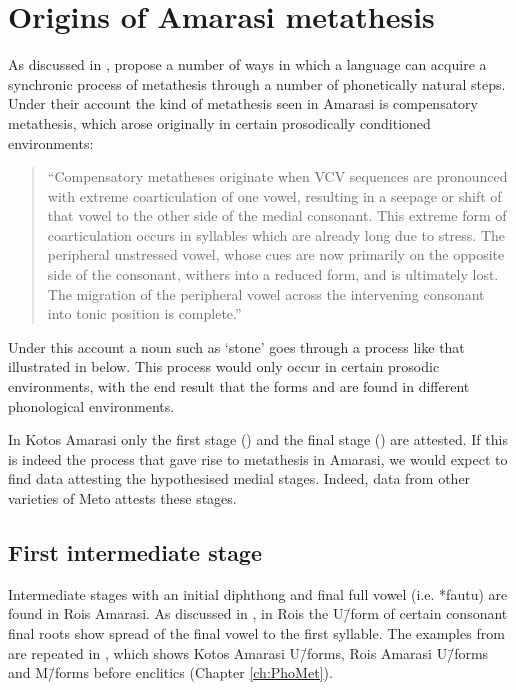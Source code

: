 \section{Origins of Amarasi metathesis}\label{sec:OriMetAma}
As discussed in , \cite{blga98,blga04} propose
a number of ways in which a language can acquire a synchronic process
of metathesis through a number of phonetically natural steps.
Under their account the kind of metathesis seen
in Amarasi is compensatory metathesis,
which arose originally in certain prosodically conditioned environments:

\begin{quote}
``Compensatory metatheses originate when VCV sequences
are pronounced with extreme coarticulation of one vowel,
resulting in a seepage or shift of that vowel to the other side of the medial consonant.
This extreme form of coarticulation occurs in syllables which are already long due to stress.
The peripheral unstressed vowel, whose cues are now primarily on the opposite side of the consonant,
withers into a reduced form, and is ultimately lost.
The migration of the peripheral vowel across the intervening
consonant into tonic position is complete.'' \hfill\citep[529]{blga98}
\end{quote}

Under this account a noun such as  `stone' goes 
through a process like that illustrated in  below.
This process would only occur in certain prosodic environments,
with the end result that the forms  and 
are found in different phonological environments.

\begin{exe}
	\label{ex:fautu}
\end{exe}

In Kotos Amarasi only the first stage ()
and the final stage () are attested.
If this is indeed the process that gave rise to metathesis in Amarasi,
we would expect to find data attesting the hypothesised medial stages.
Indeed, data from other varieties of Meto attests these stages.

\subsection{First intermediate stage}
Intermediate stages with an initial diphthong and final full vowel
(i.e. *fautu) are found in Ro{\Q}is Amarasi.
As discussed in ,
in Ro{\Q}is the U\=/form of certain consonant final roots
show spread of the final vowel to the first syllable.
The examples from 
are repeated in ,
which shows Kotos Amarasi U\=/forms, Ro{\Q}is Amarasi U\=/forms
and M\=/forms before enclitics (Chapter \ref{ch:PhoMet}).

